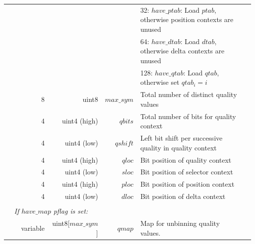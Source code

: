 \documentclass[a4paper]{article}
\begin{document}
\begin{table}
\begin{tabular}{|r|r|r|r|r|p{8cm}|l|l|}
                       & \multicolumn{2}{r|}{}         &                &                                & \multicolumn{2}{p{8.4cm}|}{32: $have\_ptab$: Load $ptab$, otherwise position contexts are unused} & \\
                       & \multicolumn{2}{r|}{}         &                &                                & \multicolumn{2}{p{8.4cm}|}{64: $have\_dtab$: Load $dtab$, otherwise delta contexts are unused} & \\
                       & \multicolumn{2}{r|}{}         &                &                                & \multicolumn{2}{p{8.4cm}|}{128: $have\_qtab$: Load $qtab$, otherwise set $qtab_i = i$} &\\
\cline{2-7}
                       & \multicolumn{2}{r|}{8}        & uint8          & $max\_sym$                     & \multicolumn{2}{p{8.4cm}|}{Total number of distinct quality values} & \\ 
\cline{2-7}
                       & \multicolumn{2}{r|}{4}        & uint4 (high)   & $qbits$                        & \multicolumn{2}{p{8.4cm}|}{Total number of bits for quality context} & \\
                       & \multicolumn{2}{r|}{4}        & uint4 (low)    & $qshift$                       & \multicolumn{2}{p{8.4cm}|}{Left bit shift per successive quality in quality context} & \\
                       & \multicolumn{2}{r|}{4}        & uint4 (high)   & $qloc$                         & \multicolumn{2}{p{8.4cm}|}{Bit position of quality context} & \\
                       & \multicolumn{2}{r|}{4}        & uint4 (low)    & $sloc$                         & \multicolumn{2}{p{8.4cm}|}{Bit position of selector context} & \\
                       & \multicolumn{2}{r|}{4}        & uint4 (high)   & $ploc$                         & \multicolumn{2}{p{8.4cm}|}{Bit position of position context} & \\
                       & \multicolumn{2}{r|}{4}        & uint4 (low)    & $dloc$                         & \multicolumn{2}{p{8.4cm}|}{Bit position of delta context }& \\ 
\cline{2-7}

& \multicolumn{6}{l|}{} & \\[-0.7em]
\multicolumn{1}{|l|}{} & \multicolumn{6}{l|}{ \textit{If $have\_map$ pflag is set:} } & \\ 
\cline{3-6}
                       &  & variable                   & uint8[$max\_sym$]          & $qmap$             & Map for unbinning quality values. & & \\
\cline{3-6}


\end{tabular}
\end{table}
\end{document}
